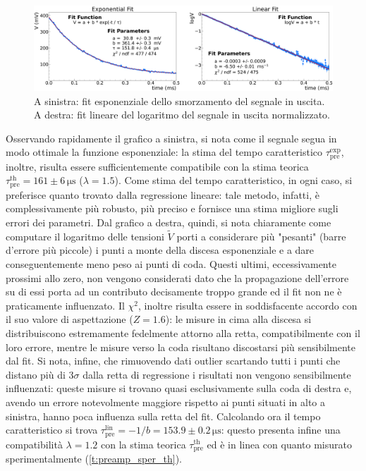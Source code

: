 \documentclass[a4paper,11pt]{article} %
\begin{document}
\begin{figure}[H]
	\centering
	\includegraphics[width=\linewidth]{../Plots/PreAmp/preamp_arduino_fit2.png}
	\vspace{-20pt}
	\caption{\small A sinistra: fit esponenziale dello smorzamento del segnale in uscita. 
					A destra: fit lineare del logaritmo del segnale in uscita normalizzato.}
	\label{i:preamp_arduino_fit}
\end{figure}
\vspace{-7pt}
Osservando rapidamente il grafico a sinistra, si nota come il segnale segua in modo ottimale la funzione esponenziale:
la stima del tempo caratteristico $\tau_{\text{pre}}^{\text{exp}}$, inoltre, risulta essere sufficientemente compatibile
con la stima teorica $\tau_{\text{pre}}^{\text{th}} = 161 \pm 6 \,\si{\us}$ ($\lambda = 1.5$). Come stima del tempo
caratteristico, in ogni caso, si preferisce quanto trovato dalla regressione lineare: tale metodo, infatti, è
complessivamente più robusto, più preciso e fornisce una stima migliore sugli errori dei parametri. Dal grafico a
destra, quindi, si nota chiaramente come computare il logaritmo delle tensioni $\tilde{V}$ porti a considerare più
"pesanti" (barre d'errore più piccole) i punti a monte della discesa esponenziale e a dare conseguentemente meno peso ai
punti di coda. Questi ultimi, eccessivamente prossimi allo zero, non vengono considerati dato che la propagazione
dell'errore su di essi porta ad un contributo decisamente troppo grande ed il fit non ne è praticamente influenzato. Il
$\chi^2$, inoltre risulta essere in soddisfacente accordo con il suo valore di aspettazione ($Z = 1.6$): le misure in
cima alla discesa si distribuiscono estremamente fedelmente attorno alla retta, compatibilmente con il loro errore,
mentre le misure verso la coda risultano discostarsi più sensibilmente dal fit. Si nota, infine, che rimuovendo dati
outlier scartando tutti i punti che distano più di $3\sigma$ dalla retta di regressione i risultati non vengono
sensibilmente influenzati: queste misure si trovano quasi esclusivamente sulla coda di destra e, avendo un errore
notevolmente maggiore rispetto ai punti situati in alto a sinistra, hanno poca influenza sulla retta del fit. Calcolando
ora il tempo caratteristico si trova $\tau_{\text{pre}}^{\text{lin}}= -1/b = 153.9 \pm 0.2 \,\si{\us}$: questo presenta
infine una compatibilità $\lambda = 1.2$ con  la stima teorica $\tau_{\text{pre}}^{\text{th}}$ ed è in linea con quanto
misurato sperimentalmente (\autoref{t:preamp_sper_th}).
\end{document}

